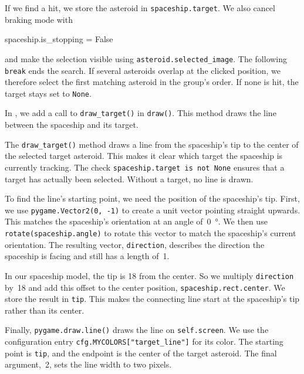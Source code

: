 If we find a hit, we store the asteroid in \texttt{spaceship.target}. We also cancel braking mode with
\begin{codebox}
	spaceship.is_stopping = False
\end{codebox}
and make the selection visible using \texttt{asteroid.selected\_image}. The following \texttt{break} ends the search. If several asteroids overlap at the clicked position, we therefore select the first matching asteroid in the group's order. If none is hit, the target stays set to \texttt{None}.


In , we add a call to \texttt{draw\_target()} in \texttt{draw()}. This method draws the line between the spaceship and its target.


The \texttt{draw\_target()} method draws a line from the spaceship's tip to the center of the selected target asteroid. This makes it clear which target the spaceship is currently tracking. The check \texttt{spaceship.target is not None} ensures that a target has actually been selected. Without a target, no line is drawn.

To find the line's starting point, we need the position of the spaceship's tip. First, we use \texttt{pygame.Vector2(0, -1)} to create a unit vector pointing straight upwards. This matches the spaceship's orientation at an angle of~\SI{0}{\degree}. We then use \texttt{rotate(spaceship\-.angle)} to rotate this vector to match the spaceship's current orientation. The resulting vector, \texttt{direction}, describes the direction the spaceship is facing and still has a length of~1.

In our spaceship model, the tip is \SI{18}{\pixel} from the center. So we multiply \texttt{direction} by~18 and add this offset to the center position, \texttt{spaceship.rect.center}. We store the result in \texttt{tip}. This makes the connecting line start at the spaceship's tip rather than its center.

Finally, \texttt{pygame.draw.line()} draws the line on \texttt{self.screen}. We use the configuration entry \texttt{cfg.MYCOLORS["target\_line"]} for its color. The starting point is \texttt{tip}, and the endpoint is the center of the target asteroid. The final argument,~2, sets the line width to two pixels.

